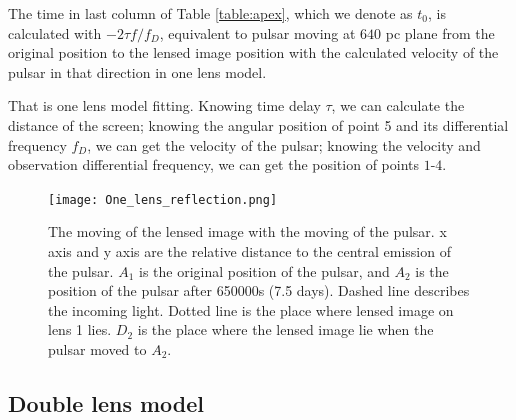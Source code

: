 \documentclass[useAMS,usenatbib]{mn2e}
\begin{document}
The time in last column of Table \ref{table:apex}, which we denote as $t_0$, is calculated with $-2{\tau}f/{f_{D}}$,
equivalent to pulsar moving at $640$ pc plane from the
original position to the lensed image position with the calculated velocity of the pulsar in that direction in one lens model.

That is one lens model fitting. Knowing time delay ${\tau}$, we can calculate the distance of the screen; knowing the angular position of point 5 and its differential frequency ${f_D}$, we can get the velocity of the pulsar; knowing the velocity and observation differential frequency, we can get the position of points $1$-$4$. 

\begin{figure}
\centering
\texttt{[image: One\_lens\_reflection.png]}
\caption{The moving of the lensed image with the moving of the pulsar. x axis and y axis are the relative distance to the central emission of the pulsar. $A_1$ is the original position of the pulsar, and $A_2$ is the position of the pulsar after 650000s (7.5 days). Dashed line describes the incoming light. Dotted line is the place where lensed image on lens 1 lies. $D_2$ is the place where the lensed image lie when the pulsar moved to $A_2$.}
\label{OneLensReflect}
\end{figure}


\subsection{Double lens model}
\label{doublelensmodel}
\end{document}
